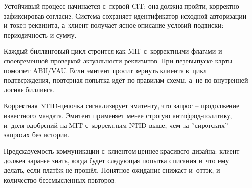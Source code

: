 Устойчивый процесс начинается с~первой CIT: она должна пройти,
корректно зафиксировав согласие. Система сохраняет идентификатор
исходной авторизации и токен реквизита, а~клиент получает ясное
описание условий подписки: периодичность и сумму.

Каждый биллинговый цикл строится как MIT с~корректными флагами
и своевременной проверкой актуальности реквизитов. При перевыпуске
карты помогает ABU/VAU. Если эмитент просит вернуть клиента в~цикл
подтверждения, повторная попытка идёт по правилам схемы, а~не по
внутренней логике биллинга.

Корректная NTID-цепочка сигнализирует эмитенту, что запрос --
продолжение известного мандата. Эмитент применяет менее строгую
антифрод-политику, и~доля одобрений на MIT с~корректным NTID
выше, чем на \enquote{сиротских} запросах без истории.

Предсказуемость коммуникации с~клиентом ценнее красивого дизайна:
клиент должен заранее знать, когда будет следующая попытка списания
и~что ему делать, если платёж не прошёл. Понятное ожидание снижает
и~отток, и количество бессмысленных повторов.

